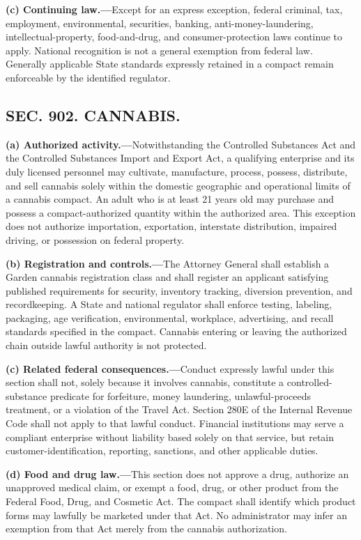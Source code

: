\documentclass[12pt,letterpaper]{article}
\begin{document}
\textbf{(c) Continuing law.---}Except for an express exception, federal criminal, tax, employment, environmental, securities, banking, anti-money-laundering, intellectual-property, food-and-drug, and consumer-protection laws continue to apply. National recognition is not a general exemption from federal law. Generally applicable State standards expressly retained in a compact remain enforceable by the identified regulator.

\subsection*{SEC. 902. CANNABIS.}

\textbf{(a) Authorized activity.---}Notwithstanding the Controlled Substances Act and the Controlled Substances Import and Export Act, a qualifying enterprise and its duly licensed personnel may cultivate, manufacture, process, possess, distribute, and sell cannabis solely within the domestic geographic and operational limits of a cannabis compact. An adult who is at least 21 years old may purchase and possess a compact-authorized quantity within the authorized area. This exception does not authorize importation, exportation, interstate distribution, impaired driving, or possession on federal property.

\textbf{(b) Registration and controls.---}The Attorney General shall establish a Garden cannabis registration class and shall register an applicant satisfying published requirements for security, inventory tracking, diversion prevention, and recordkeeping. A State and national regulator shall enforce testing, labeling, packaging, age verification, environmental, workplace, advertising, and recall standards specified in the compact. Cannabis entering or leaving the authorized chain outside lawful authority is not protected.

\textbf{(c) Related federal consequences.---}Conduct expressly lawful under this section shall not, solely because it involves cannabis, constitute a controlled-substance predicate for forfeiture, money laundering, unlawful-proceeds treatment, or a violation of the Travel Act. Section 280E of the Internal Revenue Code shall not apply to that lawful conduct. Financial institutions may serve a compliant enterprise without liability based solely on that service, but retain customer-identification, reporting, sanctions, and other applicable duties.

\textbf{(d) Food and drug law.---}This section does not approve a drug, authorize an unapproved medical claim, or exempt a food, drug, or other product from the Federal Food, Drug, and Cosmetic Act. The compact shall identify which product forms may lawfully be marketed under that Act. No administrator may infer an exemption from that Act merely from the cannabis authorization.
\end{document}
